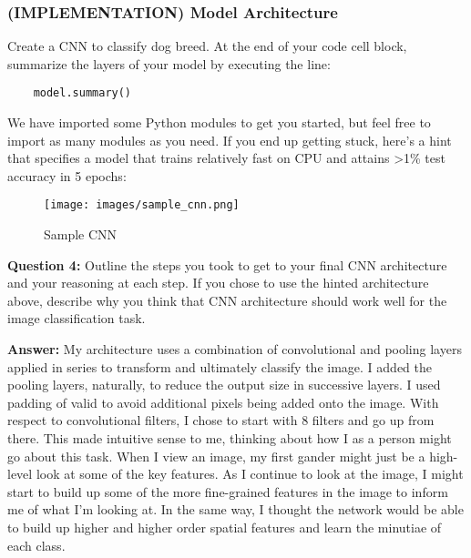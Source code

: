 \documentclass[11pt]{article}
\makeatletter
\def\maxwidth{\ifdim\Gin@nat@width>\linewidth\linewidth
    \else\Gin@nat@width\fi}
\let\Oldincludegraphics\includegraphics
\renewcommand{\includegraphics}[1]{\Oldincludegraphics[width=.8\maxwidth]{#1}}
\makeatother
\begin{document}
    \hypertarget{implementation-model-architecture}{%
\subsubsection{(IMPLEMENTATION) Model
Architecture}\label{implementation-model-architecture}}

Create a CNN to classify dog breed. At the end of your code cell block,
summarize the layers of your model by executing the line:

\begin{verbatim}
    model.summary()
\end{verbatim}

We have imported some Python modules to get you started, but feel free
to import as many modules as you need. If you end up getting stuck,
here's a hint that specifies a model that trains relatively fast on CPU
and attains \textgreater{}1\% test accuracy in 5 epochs:

\begin{figure}
\centering
\texttt{[image: images/sample\_cnn.png]}
\caption{Sample CNN}
\end{figure}

\textbf{Question 4:} Outline the steps you took to get to your final CNN
architecture and your reasoning at each step. If you chose to use the
hinted architecture above, describe why you think that CNN architecture
should work well for the image classification task.

\textbf{Answer:} My architecture uses a combination of convolutional and
pooling layers applied in series to transform and ultimately classify
the image. I added the pooling layers, naturally, to reduce the output
size in successive layers. I used padding of valid to avoid additional
pixels being added onto the image. With respect to convolutional
filters, I chose to start with 8 filters and go up from there. This made
intuitive sense to me, thinking about how I as a person might go about
this task. When I view an image, my first gander might just be a
high-level look at some of the key features. As I continue to look at
the image, I might start to build up some of the more fine-grained
features in the image to inform me of what I'm looking at. In the same
way, I thought the network would be able to build up higher and higher
order spatial features and learn the minutiae of each class.
\end{document}
